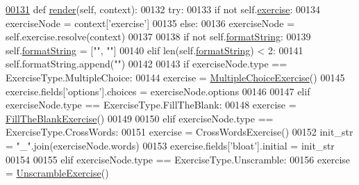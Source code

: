 \begin{DoxyCode}
\hypertarget{classCourse_1_1templatetags_1_1exercises_1_1ExerciseToken_l00131}{}\hyperlink{classCourse_1_1templatetags_1_1exercises_1_1ExerciseToken_af53c156486c9175af84cd003285aa95e}{00131}     \textcolor{keyword}{def }\hyperlink{classCourse_1_1templatetags_1_1exercises_1_1ExerciseToken_af53c156486c9175af84cd003285aa95e}{render}(self, context):
00132         \textcolor{keywordflow}{try}:
00133             \textcolor{keywordflow}{if} \textcolor{keywordflow}{not} self.\hyperlink{classCourse_1_1templatetags_1_1exercises_1_1ExerciseToken_a7051cf9758ec633ad62d57161d73c852}{exercise}:
00134                 exerciseNode = context[\textcolor{stringliteral}{'exercise'}]
00135             \textcolor{keywordflow}{else}:
00136                 exerciseNode = self.exercise.resolve(context)
00137 
00138             \textcolor{keywordflow}{if} \textcolor{keywordflow}{not} self.\hyperlink{classCourse_1_1templatetags_1_1exercises_1_1ExerciseToken_ae15b200ce6e26966169799ea67b67bcd}{formatString}:
00139                 self.\hyperlink{classCourse_1_1templatetags_1_1exercises_1_1ExerciseToken_ae15b200ce6e26966169799ea67b67bcd}{formatString} = [\textcolor{stringliteral}{""}, \textcolor{stringliteral}{""}]
00140             \textcolor{keywordflow}{elif} len(self.\hyperlink{classCourse_1_1templatetags_1_1exercises_1_1ExerciseToken_ae15b200ce6e26966169799ea67b67bcd}{formatString}) < 2:
00141                 self.formatString.append(\textcolor{stringliteral}{""})
00142 
00143             \textcolor{keywordflow}{if} exerciseNode.type == ExerciseType.MultipleChoice:
00144                 exercise = \hyperlink{classCourse_1_1forms_1_1MultipleChoiceExercise}{MultipleChoiceExercise}()
00145                 exercise.fields[\textcolor{stringliteral}{'options'}].choices = exerciseNode.options
00146 
00147             \textcolor{keywordflow}{elif} exerciseNode.type == ExerciseType.FillTheBlank:
00148                 exercise = \hyperlink{classCourse_1_1forms_1_1FillTheBlankExercise}{FillTheBlankExercise}()
00149 
00150             \textcolor{keywordflow}{elif} exerciseNode.type == ExerciseType.CrossWords:
00151                 exercise = CrossWordsExercise()
00152                 init\_str = \textcolor{stringliteral}{"\_"}.join(exerciseNode.words)
00153                 exercise.fields[\textcolor{stringliteral}{'bloat'}].initial = init\_str
00154 
00155             \textcolor{keywordflow}{elif} exerciseNode.type == ExerciseType.Unscramble:
00156                 exercise = \hyperlink{classCourse_1_1forms_1_1UnscrambleExercise}{UnscrambleExercise}()

\end{DoxyCode}
